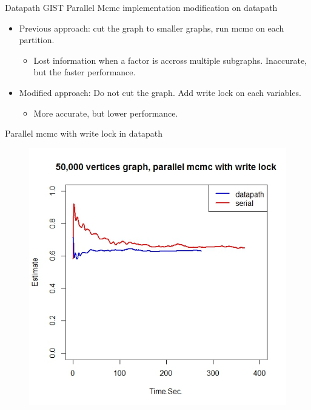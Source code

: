 \documentclass[onlymath,xcolor=pdftex,dvipsnames,table]{beamer}
\newcommand{\gist}{\textsc{GIST}\xspace}
\newcommand{\head}[1]{{\large\color{OliveGreen}#1\\[2pt]}}
\begin{document}
\begin{frame}{Datapath \gist}
\head{Parallel Mcmc implementation modification on datapath}
\begin{itemize}
  \item Previous approach: cut the graph to smaller graphs, run mcmc on
    each partition.
    \begin{itemize}
      \item Lost information when a factor is accross multiple
        subgraphs.  Inaccurate, but the faster performance.
    \end{itemize}
  \item Modified approach: Do not cut the graph. Add write lock on each
    variables.
    \begin{itemize}
      \item More accurate, but lower performance. 
    \end{itemize}
\end{itemize}
\end{frame}


\begin{frame}{Parallel mcmc with write lock in datapath}
\begin{figure}
  \centering
  \includegraphics[width=.6\textwidth]{R1.jpeg}
\end{figure}
\end{frame}
\end{document}
